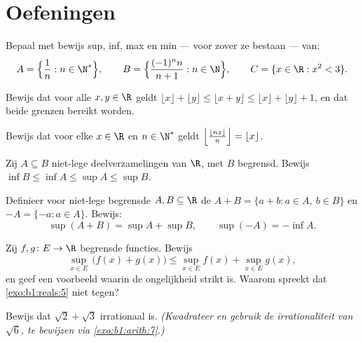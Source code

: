 \section{Oefeningen}

\begin{exercise}[$\star$]\label{exo:b1:reals:1}
Bepaal met bewijs sup, inf, max en min --- voor zover ze bestaan --- van:
\[
A = \Bigl\{\frac{1}{n} : n \in \N^*\Bigr\},
\qquad
B = \Bigl\{\frac{(-1)^n n}{n+1} : n \in \N\Bigr\},
\qquad
C = \{x \in \R : x^2 < 3\}.
\]
\end{exercise}

\begin{exercise}[$\star$]\label{exo:b1:reals:2}
Bewijs dat voor alle $x, y \in \R$ geldt $\lfloor x \rfloor + \lfloor y
\rfloor \leq \lfloor x + y \rfloor \leq \lfloor x \rfloor + \lfloor y
\rfloor + 1$, en dat beide grenzen bereikt worden.
\end{exercise}

\begin{exercise}[$\star$]\label{exo:b1:reals:3}
Bewijs dat voor elke $x \in \R$ en $n \in \N^*$ geldt
$\Bigl\lfloor \frac{\lfloor nx \rfloor}{n} \Bigr\rfloor = \lfloor x
\rfloor$.
\end{exercise}

\begin{exercise}[$\star$]\label{exo:b1:reals:4}
Zij $A \subseteq B$ niet-lege deelverzamelingen van $\R$, met $B$
begrensd. Bewijs $\inf B \leq \inf A \leq \sup A \leq \sup B$.
\end{exercise}

\begin{exercise}[$\star\star$]\label{exo:b1:reals:5}
Definieer voor niet-lege begrensde $A, B \subseteq \R$ de 
$A + B = \{a + b : a \in A,\ b \in B\}$ en $-A = \{-a : a \in A\}$.
Bewijs:
\[
\sup(A + B) = \sup A + \sup B,
\qquad
\sup(-A) = -\inf A .
\]
\end{exercise}

\begin{exercise}[$\star\star$]\label{exo:b1:reals:6}
Zij $f, g \colon E \to \R$ begrensde functies. Bewijs
\[
\sup_{x \in E}\, \bigl(f(x) + g(x)\bigr) \leq \sup_{x \in E} f(x) +
\sup_{x \in E} g(x),
\]
en geef een voorbeeld waarin de ongelijkheid strikt is. Waarom spreekt
dat \cref{exo:b1:reals:5} niet tegen?
\end{exercise}

\begin{exercise}[$\star\star$]\label{exo:b1:reals:7}
Bewijs dat $\sqrt 2 + \sqrt 3$ irrationaal is. \emph{(Kwadrateer en
gebruik de irrationaliteit van $\sqrt 6$, te bewijzen via
\cref{exo:b1:arith:7}.)}
\end{exercise}

